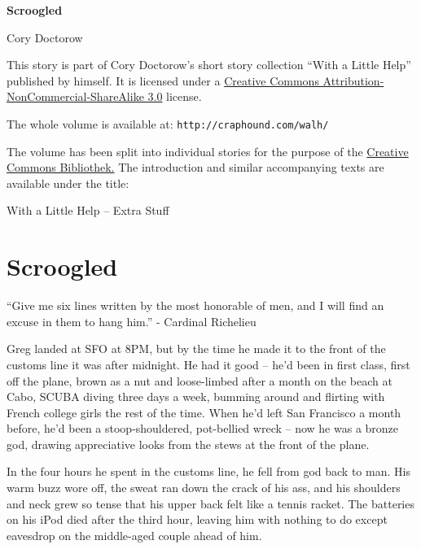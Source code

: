 


\raggedbottom

\begin{center}
\textbf{\huge\textsf{Scroogled}}

\medskip
Cory Doctorow

\end{center}

\bigskip

\begin{flushleft}
This story is part of Cory Doctorow’s short story collection
“With a Little Help” published by himself. It is licensed under a
\href{http://creativecommons.org/licenses/by-nc-sa/}
{Creative Commons Attribution-NonCommercial-ShareAlike 3.0} license.

\bigskip

The whole volume is available at:
\texttt{http://craphound.com/walh/}

\medskip

The volume has been split into individual stories for the purpose of the
\href{http://ccbib.org}{Creative Commons Bibliothek.}
The introduction and similar accompanying texts are available under the 
title:
\end{flushleft}
\begin{center}
With a Little Help -- Extra Stuff
\end{center}

\newpage

\section{Scroogled}

“Give me six lines written by the most honorable of men, and I will 
find an excuse in them to hang him.” - Cardinal Richelieu

Greg landed at SFO at 8PM, but by the time he made it to the front of 
the customs line it was after midnight. He had it good -- he'd been in 
first class, first off the plane, brown as a nut and loose-limbed after 
a month on the beach at Cabo, SCUBA diving three days a week, bumming 
around and flirting with French college girls the rest of the time. 
When he'd left San Francisco a month before, he'd been a 
stoop-shouldered, pot-bellied wreck -- now he was a bronze god, drawing 
appreciative looks from the stews at the front of the plane.

In the four hours he spent in the customs line, he fell from god back 
to man. His warm buzz wore off, the sweat ran down the crack of his 
ass, and his shoulders and neck grew so tense that his upper back felt 
like a tennis racket. The batteries on his iPod died after the third 
hour, leaving him with nothing to do except eavesdrop on the 
middle-aged couple ahead of him.

